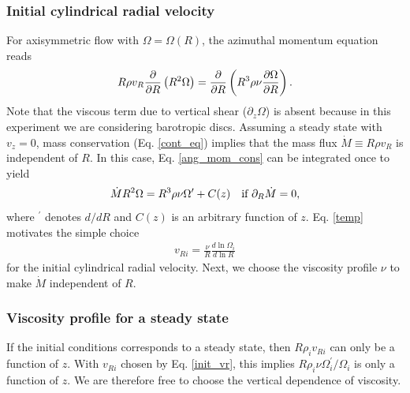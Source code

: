 \subsubsection{Initial cylindrical radial velocity}
For axisymmetric flow with $\Omega=\Omega(R)$, the azimuthal momentum
equation reads  
\begin{align}\label{ang_mom_cons}
  R\rho v_R\frac{\partial}{\partial R}\left(R^2\Omega \right) = \frac{\partial}{\partial
    R}\left(R^3\rho\nu\frac{\partial\Omega}{\partial R}\right). 
\end{align}
Note that the viscous term due to vertical shear ($\partial_z\Omega$) 
is absent because in this experiment we are considering barotropic
discs. Assuming a steady state with $v_z=0$, mass
conservation (Eq. \ref{cont_eq}) implies that the mass flux  
$\dot{M}\equiv R\rho v_R$ is independent of $R$. In this case,
Eq. \ref{ang_mom_cons} can 
be integrated once to yield 
\begin{align}\label{temp}
  \dot{M}R^2\Omega = R^3\rho\nu\Omega^\prime + C(z) \quad \text{if $\partial_R\dot{M}$} = 0, 
\end{align}
where $^\prime$ denotes $d/dR$ and $C(z)$ is an arbitrary function of
$z$. Eq. \ref{temp} motivates the simple choice
\begin{align}\label{init_vr} 
  v_{Ri} = \frac{\nu}{R}\frac{d\ln{\Omega_i}}{d\ln{R}} 
\end{align}
for the initial cylindrical radial velocity. Next, we choose the
viscosity profile $\nu$ to make $\dot{M}$ independent of $R$.   

\subsubsection{Viscosity profile for a steady state}\label{visc_model}
If the initial conditions corresponds to a steady state, then
$R \rho_i v_{Ri}$ can only be a function of $z$. With $v_{Ri}$ chosen
by Eq. \ref{init_vr}, this implies 
$R\rho_i\nu\Omega_i^\prime/\Omega_i$ is only a function of $z$. We are
therefore free to choose the vertical dependence of viscosity.   

